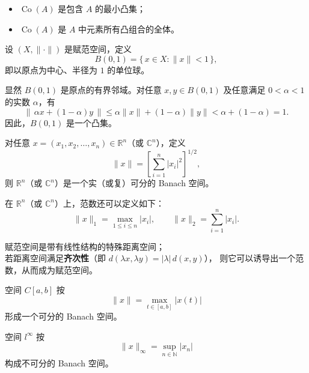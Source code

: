 \begin{itemize}
  \item $\operatorname{Co}(A)$ 是包含 $A$ 的最小凸集；
  \item $\operatorname{Co}(A)$ 是 $A$ 中元素所有凸组合的全体。
\end{itemize}
\begin{example}
设 $(X,\|\cdot\|)$ 是赋范空间，定义
\[
B(0,1)=\{\,x\in X:\|x\|<1\,\},
\]
即以原点为中心、半径为 $1$ 的单位球。

显然 $B(0,1)$ 是原点的有界邻域。对任意 $x,y\in B(0,1)$ 及任意满足 $0<\alpha<1$ 的实数 $\alpha$，有
\[
\|\,\alpha x+(1-\alpha)y\,\|
\le \alpha\|x\|+(1-\alpha)\|y\|
< \alpha+(1-\alpha)=1.
\]
因此，$B(0,1)$ 是一个凸集。
\end{example}
\begin{example}
对任意 $x=(x_1,x_2,\dots,x_n)\in\mathbb{R}^n$（或 $\mathbb{C}^n$），定义
\[
\|x\|=\left[\sum_{i=1}^{n}|x_i|^2\right]^{1/2},
\]
则 $\mathbb{R}^n$（或 $\mathbb{C}^n$）是一个实（或复）可分的 Banach 空间。

在 $\mathbb{R}^n$（或 $\mathbb{C}^n$）上，范数还可以定义如下：
\[
\|x\|_1 = \max_{1\le i\le n}|x_i|,\qquad
\|x\|_2 = \sum_{i=1}^{n}|x_i|.
\]
\end{example}
\begin{dxtips}[距离空间和赋范空间关系]
赋范空间是带有线性结构的特殊距离空间；\\[3pt]
若距离空间满足\textbf{齐次性}（即 $d(\lambda x,\lambda y)=|\lambda|\,d(x,y)$），
则它可以诱导出一个范数，从而成为赋范空间。
\end{dxtips}
\begin{example}
空间 $C[a,b]$ 按
\[
\|x\| = \max_{t\in[a,b]}|x(t)|
\]
形成一个可分的 Banach 空间。
\end{example}

\begin{example}
空间 $l^{\infty}$ 按
\[
\|x\|_{\infty} = \sup_{n\in\mathbb{N}}|x_n|
\]
构成不可分的 Banach 空间。
\end{example}

